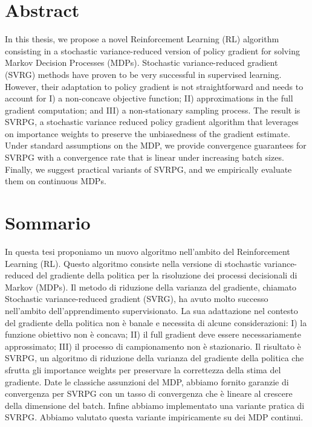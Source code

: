
\begingroup
\let\clearpage\relax
\let\cleardoublepage\relax
\let\cleardoublepage\relax

\chapter*{Abstract}
In this thesis, we propose a novel Reinforcement Learning (\acs{RL}) algorithm consisting in a stochastic variance-reduced version of policy gradient for solving Markov Decision Processes (\acs{MDP}s).\newline
Stochastic variance-reduced gradient (\acs{SVRG}) methods have proven to be very successful in supervised learning. However, their adaptation to policy gradient is not straightforward and needs to account for I) a non-concave objective function; II) approximations in the full gradient computation; and III) a non-stationary sampling process. The result is \acs{SVRPG}, a stochastic variance reduced policy gradient algorithm that leverages on importance weights to preserve the unbiasedness of the gradient estimate. Under standard assumptions on the \acs{MDP}, we provide convergence guarantees for \acs{SVRPG} with a convergence rate that is linear under increasing batch sizes. Finally, we suggest practical variants of \acs{SVRPG}, and we empirically evaluate them on continuous \acs{MDP}s.

\vfill
\newpage
{}
\chapter*{Sommario}
In questa tesi proponiamo un nuovo algoritmo nell'ambito del Reinforcement Learning (\acs{RL}). Questo algoritmo consiste  nella versione di stochastic variance-reduced del gradiente della politica per la risoluzione dei processi decisionali di Markov (\acs{MDP}s).\newline
Il metodo di riduzione della varianza del gradiente, chiamato Stochastic variance-reduced gradient (\acs{SVRG}), ha avuto molto successo nell'ambito dell'apprendimento supervisionato. La sua adattazione nel contesto del gradiente della politica non è banale e necessita di alcune considerazioni: I) la funzione obiettivo non è concava; II) il full gradient deve essere necessariamente approssimato;  III) il processo di campionamento non è stazionario. Il risultato è \acs{SVRPG}, un algoritmo di riduzione della varianza del gradiente della politica che sfrutta gli importance weights per preservare la correttezza della stima del gradiente. Date le classiche assunzioni del \acs{MDP}, abbiamo fornito garanzie di convergenza per \acs{SVRPG} con un tasso di convergenza che è lineare al crescere della dimensione del batch. Infine abbiamo implementato una variante pratica di \acs{SVRPG}. Abbiamo valutato questa variante impiricamente  su dei \acs{MDP} continui.

\endgroup